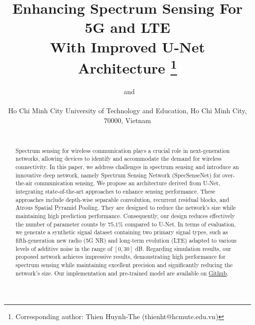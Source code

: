 \documentclass[journal]{IEEEtran} %
\begin{document}
\title{Enhancing Spectrum Sensing For 5G and LTE\\ With Improved U-Net Architecture
\thanks{Corresponding author: Thien Huynh-The (thienht@hcmute.edu.vn)}}
\author{%
    ~and %
    \\%
    \\
    {Ho Chi Minh City University of Technology and Education, Ho Chi Minh City, $70000$, Vietnam}\\%
     \\
}
\maketitle

\begin{abstract}
Spectrum sensing for wireless communication plays a crucial role in next-generation networks, allowing devices to identify and accommodate the demand for wireless connectivity. In this paper, we address challenges in spectrum sensing and introduce an innovative deep network, namely Spectrum Sensing Network (SpecSenseNet) for over-the-air communication sensing. We propose an architecture derived from U-Net, integrating state-of-the-art approaches to enhance sensing performance. These approaches include depth-wise separable convolution, recurrent residual blocks, and Atrous Spatial Pyramid Pooling. They are designed to reduce the network's size while maintaining high prediction performance. Consequently, our design reduces effectively the number of parameter counts by $75.1\%$ compared to U-Net. In terms of evaluation, we generate a synthetic signal dataset containing two primary signal types, such as fifth-generation new radio (5G NR) and long-term evolution (LTE) adapted to various levels of additive noise in the range of $\left [ 0,30 \right ]$ dB. Regarding simulation results, our proposed network achieves impressive results, demonstrating high performance for spectrum sensing while maintaining excellent precision and significantly reducing the network's size. Our implementation and pre-trained model are available on
\href{https://github.com/Winxkin/Spectrum_sensing_base_on_Deep_learning.git}{Github}.
\end{abstract}
\end{document}
